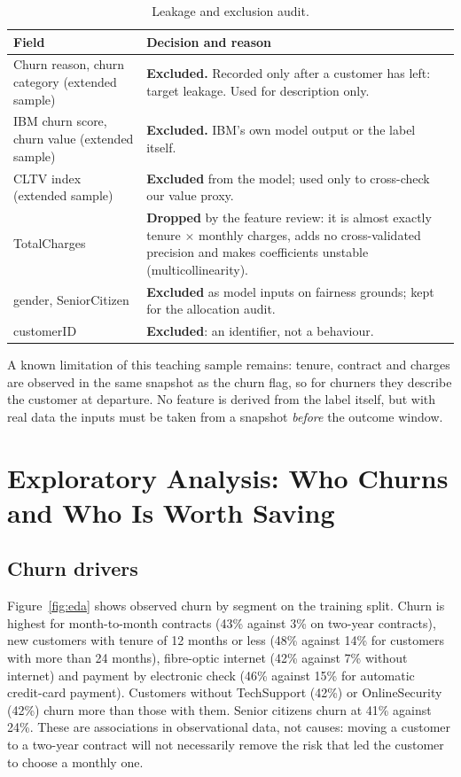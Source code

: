 \documentclass[11pt,a4paper]{article}
\begin{document}
\begin{table}[H]
\centering\small
\caption{Leakage and exclusion audit.}\label{tab:leak}
\begin{tabularx}{\linewidth}{@{}p{3.8cm}X@{}}
\toprule
\textbf{Field} & \textbf{Decision and reason} \\
\midrule
Churn reason, churn category (extended sample) & \textbf{Excluded.} Recorded only after a customer has left: target leakage. Used for description only. \\
IBM churn score, churn value (extended sample) & \textbf{Excluded.} IBM's own model output or the label itself. \\
CLTV index (extended sample) & \textbf{Excluded} from the model; used only to cross-check our value proxy. \\
TotalCharges & \textbf{Dropped} by the feature review: it is almost exactly tenure $\times$ monthly charges, adds no cross-validated precision and makes coefficients unstable (multicollinearity). \\
gender, SeniorCitizen & \textbf{Excluded} as model inputs on fairness grounds; kept for the allocation audit. \\
customerID & \textbf{Excluded}: an identifier, not a behaviour. \\
\bottomrule
\end{tabularx}
\end{table}

A known limitation of this teaching sample remains: tenure, contract and charges are observed in the same snapshot as the churn flag, so for churners they describe the customer at departure. No feature is derived from the label itself, but with real data the inputs must be taken from a snapshot \emph{before} the outcome window.

\section{Exploratory Analysis: Who Churns and Who Is Worth Saving}

\subsection{Churn drivers}

Figure~\ref{fig:eda} shows observed churn by segment on the training split. Churn is highest for month-to-month contracts (43\% against 3\% on two-year contracts), new customers with tenure of 12 months or less (48\% against 14\% for customers with more than 24 months), fibre-optic internet (42\% against 7\% without internet) and payment by electronic check (46\% against 15\% for automatic credit-card payment). Customers without TechSupport (42\%) or OnlineSecurity (42\%) churn more than those with them. Senior citizens churn at 41\% against 24\%. These are associations in observational data, not causes: moving a customer to a two-year contract will not necessarily remove the risk that led the customer to choose a monthly one.
\end{document}
